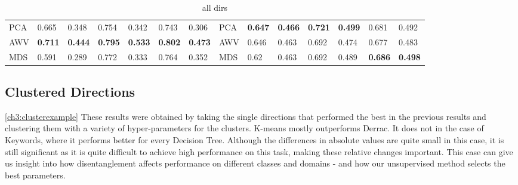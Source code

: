 \begin{landscape}
\begin{table}[]
\begin{tabular}{llllllllllllll}
PCA        & 0.665                           & 0.348                           & 0.754                           & 0.342                           & 0.743                           & 0.306                           & PCA                             & \textbf{0.647} & \textbf{0.466} & \textbf{0.721} & \textbf{0.499} & 0.681                           & 0.492                           \\
AWV        & \textbf{0.711} & \textbf{0.444} & \textbf{0.795} & \textbf{0.533} & \textbf{0.802} & \textbf{0.473} & AWV                             & 0.646                           & 0.463                           & 0.692                           & 0.474                           & 0.677                           & 0.483                           \\
MDS        & 0.591                           & 0.289                           & 0.772                           & 0.333                           & 0.764                           & 0.352                           & MDS                             & 0.62                            & 0.463                           & 0.692                           & 0.489                           & \textbf{0.686} & \textbf{0.498}
	\end{tabular}
	\caption{ all dirs}
\end{table}
\end{landscape}


\subsection{Clustered Directions}
\ref{ch3:clusterexample}
These results were obtained by taking the single directions that performed the best in the previous results and clustering them with a variety of hyper-parameters for the clusters. K-means mostly outperforms Derrac. It does not in the case of Keywords, where it performs better for every Decision Tree. Although the differences in absolute values are quite small in this case, it is still significant as it is quite difficult to achieve high performance on this task, making these relative changes important. This case can give us insight into how disentanglement affects performance on different classes and domains - and how our unsupervised method selects the best parameters. 

